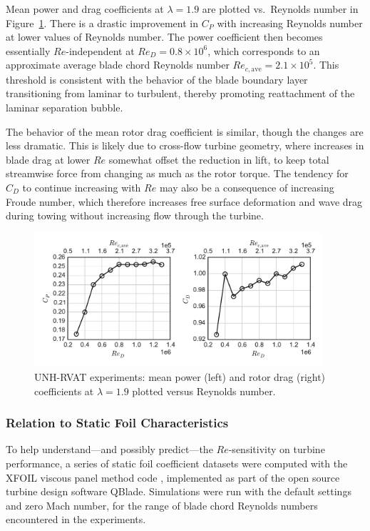 \documentclass[energies,article,accept,moreauthors,pdftex,12pt,a4paper]{mdpi}
\begin{document}
Mean power and drag coefficients at $\lambda=1.9$ are plotted vs.\ Reynolds
number in Figure~\ref{fig:perf-Re-dep}. There is a drastic improvement in $C_P$
with increasing Reynolds number at lower values of Reynolds number. The power 
coefficient then
becomes  essentially $Re$-independent at $Re_D = 0.8 \times 10^6$, which
corresponds to an approximate average blade chord Reynolds number $Re_{c,
\mathrm{ave}} = 2.1 \times 10^5$. This threshold is consistent with the behavior
of the blade boundary layer transitioning from laminar to turbulent, thereby
promoting reattachment of the laminar separation bubble.

The behavior of the mean rotor drag coefficient is similar, though the changes
are less dramatic. This is likely due to cross-flow turbine geometry, where
increases in blade drag at lower $Re$ somewhat offset the reduction in lift, to
keep total streamwise force from changing as much as the rotor torque. The
tendency for $C_D$ to continue increasing with $Re$ may also be a consequence of
increasing Froude number, which therefore increases free surface deformation and
wave drag during towing without increasing flow through the turbine.

\begin{figure}[ht]
\includegraphics[width=0.95\textwidth]{figures/perf_re_dep}
\caption{UNH-RVAT experiments: mean power (left) and rotor drag (right) 
coefficients at $\lambda=1.9$ plotted versus Reynolds number.} 
\label{fig:perf-Re-dep}
\end{figure}

\subsubsection{Relation to Static Foil Characteristics}

To help understand---and possibly predict---the $Re$-sensitivity on turbine
performance, a series of static foil coefficient datasets were computed with the
XFOIL viscous panel method code \cite{Drela1989}, implemented as part of the
open source turbine design software QBlade. Simulations were run with the
default settings and zero Mach number, for the range of blade chord
Reynolds numbers encountered in the experiments.
\end{document}
